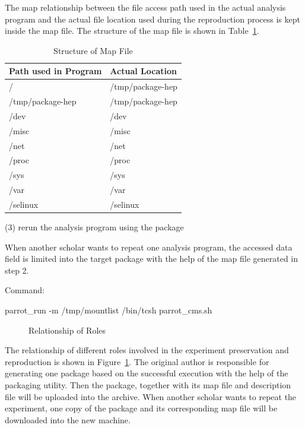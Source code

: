 \documentclass{acm_proc_article-sp}
\begin{document}
The map relationship between the file access path used in the actual analysis
program and the actual file location used during the reproduction process is
kept inside the map file. The structure of the map file is shown in Table~\ref{table:map-file}.

\begin{table}
    \centering
    \begin{tabular}{|l|l|}
    \hline
    Path used in Program & Actual Location \\ \hline
    / & /tmp/package-hep \\ \hline
    /tmp/package-hep & /tmp/package-hep \\ \hline
    /dev & /dev \\ \hline
    /misc & /misc\\ \hline
    /net & /net\\ \hline
    /proc & /proc\\ \hline
    /sys & /sys\\ \hline
    /var & /var\\ \hline
    /selinux & /selinux\\ \hline
    \end{tabular}
    \caption{Structure of Map File}
    \label{table:map-file}
\end{table}

(3) rerun the analysis program using the package

When another scholar wants to repeat one analysis program, the accessed data
field is limited into the target package with the help of the map file 
generated in step 2. 

Command:

parrot\_run -m /tmp/mountlist /bin/tcsh parrot\_cms.sh

\begin{figure}
\centering
{}
\caption{Relationship of Roles}
\label{fig:solution3}
\end{figure}

The relationship of different roles involved in the experiment preservation and
reproduction is shown in Figure~\ref{fig:solution3}.  The original author is
responsible for generating one package based on the successful execution
with the help of the packaging utility. Then the package, together with
its map file and description file will be uploaded into the archive. When
another scholar wants to repeat the experiment, one copy of the package and its
corresponding map file will be downloaded into the new machine.
\end{document}

